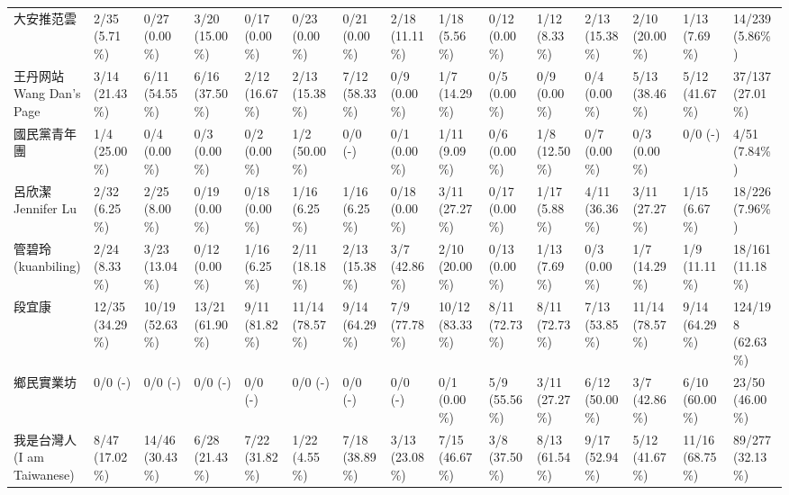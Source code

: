 \documentclass[a4paper, 10pt, conference]{ieeeconf}       %
\begin{document}
\begin{CJK}{UTF8}{bsmi}
\begin{landscape}
\begin{longtable}[c]{@{}L{2.45cm}L{1.1cm}L{1.1cm}L{1.1cm}L{1.1cm}L{1.1cm}L{1.1cm}L{1.1cm}L{1.1cm}L{1.1cm}L{1.1cm}L{1.1cm}L{1.1cm}L{1.1cm}L{1.1cm}@{}}
大安推范雲 & 2/35 (5.71\%) & 0/27 (0.00\%) & 3/20 (15.00\%) & 0/17 (0.00\%) & 0/23 (0.00\%) & 0/21 (0.00\%) & 2/18 (11.11\%) & 1/18 (5.56\%) & 0/12 (0.00\%) & 1/12 (8.33\%) & 2/13 (15.38\%) & 2/10 (20.00\%) & 1/13 (7.69\%) & 14/239 (5.86\%) \\
王丹网站 Wang Dan's Page & 3/14 (21.43\%) & 6/11 (54.55\%) & 6/16 (37.50\%) & 2/12 (16.67\%) & 2/13 (15.38\%) & 7/12 (58.33\%) & 0/9 (0.00\%) & 1/7 (14.29\%) & 0/5 (0.00\%) & 0/9 (0.00\%) & 0/4 (0.00\%) & 5/13 (38.46\%) & 5/12 (41.67\%) & 37/137 (27.01\%) \\
國民黨青年團 & 1/4 (25.00\%) & 0/4 (0.00\%) & 0/3 (0.00\%) & 0/2 (0.00\%) & 1/2 (50.00\%) & 0/0 \newline (-) & 0/1 (0.00\%) & 1/11 (9.09\%) & 0/6 (0.00\%) & 1/8 (12.50\%) & 0/7 (0.00\%) & 0/3 (0.00\%) & 0/0 \newline (-) & 4/51 (7.84\%) \\
呂欣潔 Jennifer Lu & 2/32 (6.25\%) & 2/25 (8.00\%) & 0/19 (0.00\%) & 0/18 (0.00\%) & 1/16 (6.25\%) & 1/16 (6.25\%) & 0/18 (0.00\%) & 3/11 (27.27\%) & 0/17 (0.00\%) & 1/17 (5.88\%) & 4/11 (36.36\%) & 3/11 (27.27\%) & 1/15 (6.67\%) & 18/226 (7.96\%) \\
管碧玲 (kuanbiling) & 2/24 (8.33\%) & 3/23 (13.04\%) & 0/12 (0.00\%) & 1/16 (6.25\%) & 2/11 (18.18\%) & 2/13 (15.38\%) & 3/7 (42.86\%) & 2/10 (20.00\%) & 0/13 (0.00\%) & 1/13 (7.69\%) & 0/3 (0.00\%) & 1/7 (14.29\%) & 1/9 (11.11\%) & 18/161 (11.18\%) \\
段宜康 & 12/35 (34.29\%) & 10/19 (52.63\%) & 13/21 (61.90\%) & 9/11 (81.82\%) & 11/14 (78.57\%) & 9/14 (64.29\%) & 7/9 (77.78\%) & 10/12 (83.33\%) & 8/11 (72.73\%) & 8/11 (72.73\%) & 7/13 (53.85\%) & 11/14 (78.57\%) & 9/14 (64.29\%) & 124/198 (62.63\%) \\
鄉民實業坊 & 0/0 \newline (-) & 0/0 \newline (-) & 0/0 \newline (-) & 0/0 \newline (-) & 0/0 \newline (-) & 0/0 \newline (-) & 0/0 \newline (-) & 0/1 (0.00\%) & 5/9 (55.56\%) & 3/11 (27.27\%) & 6/12 (50.00\%) & 3/7 (42.86\%) & 6/10 (60.00\%) & 23/50 (46.00\%) \\
我是台灣人 (I am Taiwanese) & 8/47 (17.02\%) & 14/46 (30.43\%) & 6/28 (21.43\%) & 7/22 (31.82\%) & 1/22 (4.55\%) & 7/18 (38.89\%) & 3/13 (23.08\%) & 7/15 (46.67\%) & 3/8 (37.50\%) & 8/13 (61.54\%) & 9/17 (52.94\%) & 5/12 (41.67\%) & 11/16 (68.75\%) & 89/277 (32.13\%) \\

\end{longtable}
\end{landscape}
\end{CJK}
\end{document}
